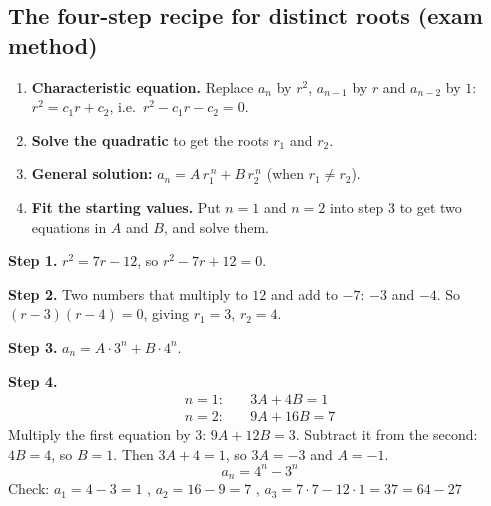 \documentclass{fkt-notes}
\theoremstyle{definition}
\begin{document}
\subsection{The four-step recipe for distinct roots (exam method)}\label{qg:recipe}
\begin{rulepar}
  \begin{enumerate}[label=\arabic*.]
    \item \textbf{Characteristic equation.} Replace $a_n$ by $r^2$,
          $a_{n-1}$ by $r$ and $a_{n-2}$ by $1$:
          $r^2 = c_1 r + c_2$, i.e.\ $r^2 - c_1 r - c_2 = 0$.
    \item \textbf{Solve the quadratic} to get the roots $r_1$ and $r_2$.
    \item \textbf{General solution:}
          $a_n = A\,r_1^{\,n} + B\,r_2^{\,n}$ (when $r_1 \neq r_2$).
    \item \textbf{Fit the starting values.} Put $n = 1$ and $n = 2$
          into step 3 to get two equations in $A$ and $B$, and solve
          them.
  \end{enumerate}
\end{rulepar}

\begin{example}[$a_n = 7a_{n-1} - 12a_{n-2}$, $a_1 = 1$, $a_2 = 7$]
  \textbf{Step 1.} $r^2 = 7r - 12$, so $r^2 - 7r + 12 = 0$.

  \textbf{Step 2.} Two numbers that multiply to $12$ and add to $-7$:
  $-3$ and $-4$. So $(r - 3)(r - 4) = 0$, giving $r_1 = 3$,
  $r_2 = 4$.

  \textbf{Step 3.} $a_n = A \cdot 3^n + B \cdot 4^n$.

  \textbf{Step 4.}
  \begin{align*}
    n = 1: \quad & 3A + 4B = 1  \\
    n = 2: \quad & 9A + 16B = 7
  \end{align*}
  Multiply the first equation by $3$: $9A + 12B = 3$. Subtract it
  from the second: $4B = 4$, so $B = 1$. Then $3A + 4 = 1$, so
  $3A = -3$ and $A = -1$.
  \[
    a_n = 4^n - 3^n
  \]
  Check: $a_1 = 4 - 3 = 1$ \checkmark, $a_2 = 16 - 9 = 7$
  \checkmark, $a_3 = 7 \cdot 7 - 12 \cdot 1 = 37 = 64 - 27$
  \checkmark
\end{example}
\end{document}
